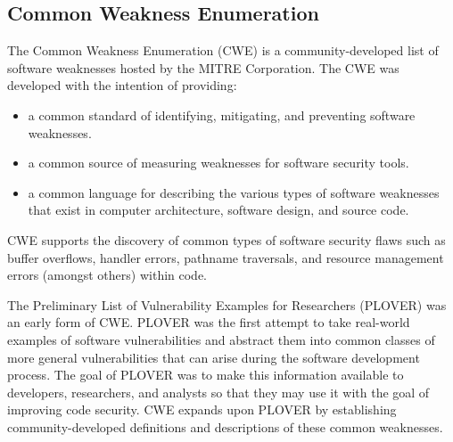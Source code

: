 \documentclass{sig-alternate}
\begin{document}
\subsection{Common Weakness Enumeration}
The Common Weakness Enumeration (CWE) \cite{mitre2006cwe} is a
community-developed list of software weaknesses hosted by the MITRE Corporation.
The CWE was developed with the intention of providing:

\begin{itemize}
	\item a common standard of identifying, mitigating, and preventing software weaknesses.
	\item a common source of measuring weaknesses for software security tools.
	\item a common language for describing the various types of software
		weaknesses that exist in computer architecture, software design, and
		source code.
\end{itemize}

CWE supports the discovery of common types of software security flaws such as
buffer overflows, handler errors, pathname traversals, and resource management
errors (amongst others) within code.


The Preliminary List of Vulnerability Examples for Researchers (PLOVER)
\cite{christey2005plover} was an early form of CWE. PLOVER was the first attempt
to take real-world examples of software vulnerabilities and abstract them into
common classes of more general vulnerabilities that can arise during the
software development process. The goal of PLOVER was to make this information
available to developers, researchers, and analysts so that they may use it with
the goal of improving code security. CWE expands upon PLOVER by establishing
community-developed definitions and descriptions of these common weaknesses.
\end{document}
